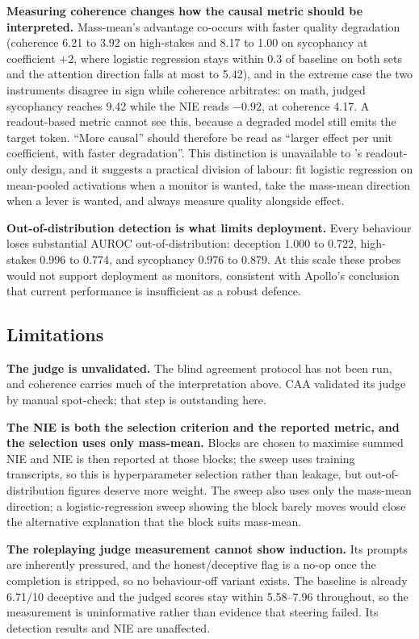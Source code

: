 \documentclass[conference]{IEEEtran}
\begin{document}
\textbf{Measuring coherence changes how the causal metric should be
interpreted.} Mass-mean's advantage co-occurs with faster quality degradation
(coherence 6.21 to 3.92 on high-stakes and 8.17 to 1.00 on sycophancy at
coefficient $+2$, where logistic regression stays within 0.3 of baseline on
both sets and the attention direction falls at most to 5.42), and
in the extreme case the two instruments disagree in sign while coherence
arbitrates: on math, judged sycophancy reaches 9.42 while the NIE reads
$-0.92$, at coherence 4.17. A readout-based metric cannot see
this, because a degraded model still emits the target token. ``More causal''
should therefore be read as ``larger effect per unit coefficient, with faster
degradation''. This distinction is unavailable to \citeauthor{marks2024}'s
readout-only design, and it suggests a practical division of labour: fit
logistic regression on mean-pooled activations when a monitor is wanted, take
the mass-mean direction when a lever is wanted, and always measure quality
alongside effect.

\textbf{Out-of-distribution detection is what limits deployment.} Every behaviour loses
substantial AUROC out-of-distribution: deception 1.000 to 0.722, high-stakes 0.996
to 0.774, and sycophancy 0.976 to 0.879. At this scale these probes would not
support deployment as monitors, consistent with Apollo's conclusion that current
performance is insufficient as a robust defence.

\subsection{Limitations}
\label{sec:limitations}

\textbf{The judge is unvalidated.} The blind agreement protocol has not been run,
and coherence carries much of the interpretation above. CAA validated its judge by
manual spot-check; that step is outstanding here.

\textbf{The NIE is both the selection criterion and the reported metric, and
the selection uses only mass-mean.} Blocks are chosen to maximise
summed NIE and NIE is then reported at those blocks; the sweep uses training
transcripts, so this is hyperparameter selection rather than leakage, but
out-of-distribution figures deserve more weight. The sweep also uses only the
mass-mean direction; a logistic-regression sweep showing the block barely moves
would close the alternative explanation that the block suits mass-mean.

\textbf{The roleplaying judge measurement cannot show induction.} Its prompts are
inherently pressured, and the honest/deceptive flag is a no-op once the completion
is stripped, so no behaviour-off variant exists. The baseline is already 6.71/10
deceptive and the judged scores stay within 5.58--7.96 throughout, so the
measurement is uninformative rather than evidence that steering failed. Its
detection results and NIE are unaffected.
\end{document}
